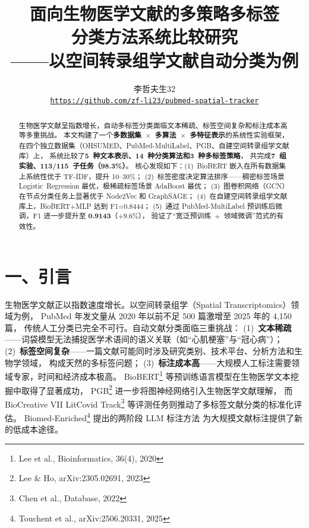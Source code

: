 \documentclass[12pt,a4paper]{ctexart}
\begin{document}
\title{\vspace{-0.8cm}\textbf{面向生物医学文献的多策略多标签\\
分类方法系统比较研究\\
——以空间转录组学文献自动分类为例}}
\author{李哲夫\quad 生32\\[2pt]
\texttt{\footnotesize\url{https://github.com/zf-li23/pubmed-spatial-tracker}}}
\date{}
\maketitle
\vspace{-0.6cm}

\begin{abstract}
\small
生物医学文献呈指数增长，自动多标签分类面临文本稀疏、标签空间复杂和标注成本高等多重挑战。
本文构建了一个\textbf{多数据集~$\times$~多算法~$\times$~多特征表示}的系统性实验框架，
在四个独立数据集（OHSUMED、PubMed-MultiLabel、PGB、自建空间转录组学文献库）上，
系统比较了\textbf{5~种文本表示、14~种分类算法和3~种多标签策略}，
共完成\textbf{7~组实验、113/115~子任务（98.3\%）}。
核心发现如下：(1)~BioBERT 嵌入在所有数据集上系统性优于 TF-IDF，提升 10--30\%；
(2)~标签密度决定算法排序——稠密标签场景 Logistic~Regression 最优，极稀疏标签场景 AdaBoost 最优；
(3)~图卷积网络（GCN）在节点分类任务上显著优于 Node2Vec 和 GraphSAGE；
(4)~在自建空间转录组学文献库上，BioBERT+MLP 达到 F1=0.8444；
(5)~通过 PubMed-MultiLabel 预训练后微调，F1 进一步提升至 \textbf{0.9143}（+9.6\%），
验证了“宽泛预训练~+~领域微调”范式的有效性。
\end{abstract}

\section{一、引言}

生物医学文献正以指数速度增长。以空间转录组学（Spatial Transcriptomics）领域为例，
PubMed 年发文量从 2020 年以前不足 500 篇激增至 2025 年的 4,150 篇，
传统人工分类已完全不可行。自动文献分类面临三重挑战：
(1)~\textbf{文本稀疏}——词袋模型无法捕捉医学术语间的语义关联（如“心肌梗塞”与“冠心病”）；
(2)~\textbf{标签空间复杂}——一篇文献可能同时涉及研究类别、技术平台、分析方法和生物学领域，
构成天然的多标签问题；
(3)~\textbf{标注成本高}——大规模人工标注需要领域专家，时间和经济成本极高。
BioBERT\footnote{Lee et al., Bioinformatics, 36(4), 2020} 等预训练语言模型在生物医学文本挖掘中取得了显著成功，
PGB\footnote{Lee \& Ho, arXiv:2305.02691, 2023} 进一步将图神经网络引入生物医学文献理解，
而 BioCreative VII LitCovid Track\footnote{Chen et al., Database, 2022} 等评测任务则推动了多标签文献分类的标准化评估。
Biomed-Enriched\footnote{Touchent et al., arXiv:2506.20331, 2025} 提出的两阶段 LLM 标注方法
为大规摸文献标注提供了新的低成本途径。
\end{document}
